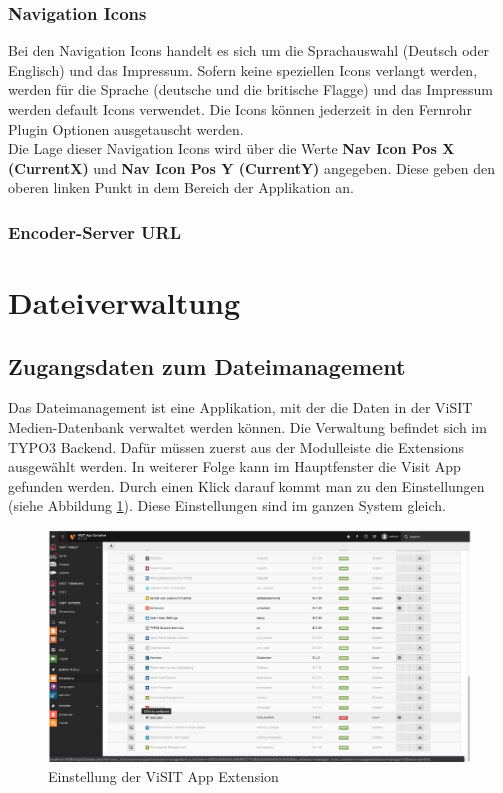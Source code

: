 \subsubsection{Navigation Icons}

Bei den Navigation Icons handelt es sich um die Sprachauswahl (Deutsch oder Englisch) und das Impressum. Sofern keine speziellen Icons verlangt werden, werden für die Sprache (deutsche und die britische Flagge) und das Impressum werden default Icons verwendet. Die Icons können jederzeit in den Fernrohr Plugin Optionen ausgetauscht werden.\\

Die Lage dieser Navigation Icons wird über die Werte \textbf{Nav Icon Pos X (CurrentX)} und \textbf{Nav Icon Pos Y (CurrentY)} angegeben. Diese geben den oberen linken Punkt in dem Bereich der Applikation an.

\subsubsection{Encoder-Server URL}



\cleardoublepage

\section{Dateiverwaltung}

\subsection{Zugangsdaten zum Dateimanagement}

Das Dateimanagement ist eine Applikation, mit der die Daten in der ViSIT Medien-Datenbank verwaltet werden können. Die Verwaltung befindet sich im TYPO3 Backend. Dafür müssen zuerst aus der Modulleiste die Extensions ausgewählt werden. In weiterer Folge kann im Hauptfenster die Visit App gefunden werden. Durch einen Klick darauf kommt man zu den Einstellungen (siehe Abbildung \ref{img:einstellung_extension}). Diese Einstellungen sind im ganzen System gleich.

\begin{figure}[ht!]
\centering
\includegraphics[width=12cm]{Figures/paula/dateiverwaltung/einstellung_extension.png}
\caption{Einstellung der ViSIT App Extension}
\label{img:einstellung_extension}
\end{figure}

